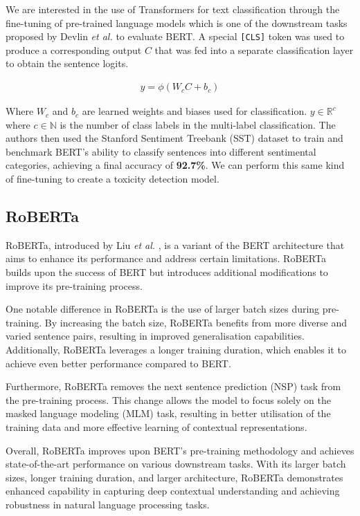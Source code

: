 We are interested in the use of Transformers for text classification through the fine-tuning of pre-trained language models which is one of the downstream tasks proposed by Devlin \textit{et al.} to evaluate BERT. A special \verb|[CLS]| token was used to produce a corresponding output $C$ that was fed into a separate classification layer to obtain the sentence logits.

\begin{equation}
    \begin{gathered}
        y = \phi\left( W_{c}C+b_{c} \right)
    \end{gathered}
    \label{eq:bert_classification}
\end{equation}

Where $W_{c}$ and $b_{c}$ are learned weights and biases used for classification. $y \in \mathbb{R}^c$ where $c \in \mathbb{N}$ is the number of class labels in the multi-label classification. The authors then used the Stanford Sentiment Treebank (SST) dataset to train and benchmark BERT's ability to classify sentences into different sentimental categories, achieving a final accuracy of \textbf{92.7\%}. We can perform this same kind of fine-tuning to create a toxicity detection model.

\subsection{RoBERTa}

RoBERTa, introduced by Liu \textit{et al.} \cite{RoBERTa}, is a variant of the BERT architecture that aims to enhance its performance and address certain limitations. RoBERTa builds upon the success of BERT but introduces additional modifications to improve its pre-training process.

One notable difference in RoBERTa is the use of larger batch sizes during pre-training. By increasing the batch size, RoBERTa benefits from more diverse and varied sentence pairs, resulting in improved generalisation capabilities. Additionally, RoBERTa leverages a longer training duration, which enables it to achieve even better performance compared to BERT.

Furthermore, RoBERTa removes the next sentence prediction (NSP) task from the pre-training process. This change allows the model to focus solely on the masked language modeling (MLM) task, resulting in better utilisation of the training data and more effective learning of contextual representations.

Overall, RoBERTa improves upon BERT's pre-training methodology and achieves state-of-the-art performance on various downstream tasks. With its larger batch sizes, longer training duration, and larger architecture, RoBERTa demonstrates enhanced capability in capturing deep contextual understanding and achieving robustness in natural language processing tasks.

